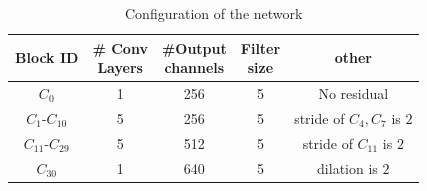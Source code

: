 \begin{table}[!tb]
    \centering
    \begin{tabular}{ccccc}
        \hline
         Block ID & \makecell{\# Conv \\ Layers} & \makecell{\#Output \\channels} & \makecell{Filter \\ size} & other \\ \hline\hline
         $C_0$ & 1 & 256 & 5 & No residual \\ \hline
         $C_1$-$C_{10}$ & 5 & 256 & 5 & stride of $C_4, C_7$ is $2$\\ \hline
         $C_{11}$-$C_{29}$ & 5 & 512 & 5 & stride of $C_{11}$ is $2$ \\ \hline
         $C_{30}$ & 1 & 640 & 5 & dilation is $2$\\ \hline
    \end{tabular}
    \caption{Configuration of the network}
    \label{tab:table}
\end{table}







